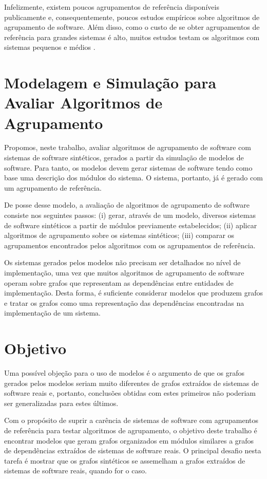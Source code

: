 Infelizmente, existem poucos agrupamentos de referência disponíveis publicamente \cite{Koschke2000} e, consequentemente, poucos estudos empíricos sobre algoritmos de agrupamento de software. Além disso, como o custo de se obter agrupamentos de referência para grandes sistemas é alto, muitos estudos testam os algoritmos com sistemas pequenos e médios \cite{Anquetil1999,Maqbool2007,Bittencourt2009}.

\section{Modelagem e Simulação para Avaliar Algoritmos de Agrupamento}

Propomos, neste trabalho, avaliar algoritmos de agrupamento de software com sistemas de software sintéticos, gerados a partir da simulação de modelos de software. Para tanto, os modelos devem gerar sistemas de software tendo como base uma descrição dos módulos do sistema. O sistema, portanto, já é gerado com um agrupamento de referência.

De posse desse modelo, a avaliação de algoritmos de agrupamento de software consiste nos seguintes passos: (i) gerar, através de um modelo, diversos sistemas de software sintéticos a partir de módulos previamente estabelecidos; (ii) aplicar algoritmos de agrupamento sobre os sistemas sintéticos; (iii) comparar os agrupamentos encontrados pelos algoritmos com os agrupamentos de referência.

Os sistemas gerados pelos modelos não precisam ser detalhados no nível de implementação, uma vez que muitos algoritmos de agrupamento de software operam sobre grafos que representam as dependências entre entidades de implementação. Desta forma, é suficiente considerar modelos que produzem grafos e tratar os grafos como uma representação das dependências encontradas na implementação de um sistema.

\section{Objetivo}

Uma possível objeção para o uso de modelos é o argumento de que os grafos gerados pelos modelos seriam muito diferentes de grafos extraídos de sistemas de software reais e, portanto, conclusões obtidas com estes primeiros não poderiam ser generalizadas para estes últimos.

Com o propósito de suprir a carência de sistemas de software com agrupamentos de referência para testar algoritmos de agrupamento, o objetivo deste trabalho é encontrar modelos que geram grafos organizados em módulos similares a grafos de dependências extraídos de sistemas de software reais. O principal desafio nesta tarefa é mostrar que os grafos sintéticos se assemelham a grafos extraídos de sistemas de software reais, quando for o caso.

